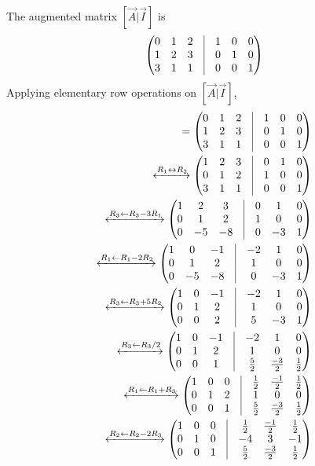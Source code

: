 \documentclass[journal,12pt,twocolumn]{IEEEtran}
\renewcommand\thesection{\arabic{section}}
\begin{document}
\begin{enumerate}[label=\thesection.\arabic*.,ref=\thesection.\theenumi]
     The augmented matrix $[\vec{A} | \vec{I}]$ is 
    \begin{align}
    \myvec{0 & 1 & 2 & \vrule & 1 & 0 & 0\\1 & 2 & 3 & \vrule & 0 & 1 & 0\\3 & 1 & 1 & \vrule & 0 & 0 & 1}
    \end{align}
    Applying elementary row operations on $[\vec{A} | \vec{I}]$, 
    \begin{align}
    [\vec{A} | \vec{I}] = \myvec{0 & 1 & 2 & \vrule & 1 & 0 & 0\\1 & 2 & 3 & \vrule & 0 & 1 & 0\\3 & 1 & 1 & \vrule & 0 & 0 & 1}
    \\
    \xleftrightarrow{R_1\leftrightarrow R_2}   
    \myvec{1 & 2 & 3 & \vrule & 0 & 1 & 0\\0 & 1 & 2 & \vrule & 1 & 0 & 0\\3 & 1 & 1 & \vrule & 0 & 0 & 1}
    \\
    \xleftrightarrow{R_3\leftarrow R_3-3R_1}   
    \myvec{1 & 2 & 3 & \vrule & 0 & 1 & 0\\0 & 1 & 2 & \vrule & 1 & 0 & 0\\0 & -5 & -8 & \vrule & 0 & -3 & 1}
    \\
    \xleftrightarrow{R_1\leftarrow R_1-2R_2}  
    \myvec{1 & 0 & -1 & \vrule & -2 & 1 & 0\\0 & 1 & 2 & \vrule & 1 & 0 & 0\\0 & -5 & -8 & \vrule & 0 & -3 & 1}
    \\
    \xleftrightarrow{R_3\leftarrow R_3+5R_2}  
    \myvec{1 & 0 & -1 & \vrule & -2 & 1 & 0\\0 & 1 & 2 & \vrule & 1 & 0 & 0\\0 & 0 & 2 & \vrule & 5 & -3 & 1}
    \\
    \xleftrightarrow{R_3\leftarrow R_3/2}
    \myvec{1 & 0 & -1 & \vrule & -2 & 1 & 0\\ 0 & 1 & 2 & \vrule & 1 & 0 & 0\\0 & 0 & 1 &\vrule &\frac{5}{2} &\frac{-3}{2} &\frac{1}{2}}
    \\
    \xleftrightarrow{R_1\leftarrow R_1+R_3}
    \myvec{1 & 0 & 0 & \vrule & \frac{1}{2} & \frac{-1}{2} & \frac{1}{2}\\ 0 & 1 & 2 & \vrule & 1 & 0 & 0\\0 & 0 & 1 &\vrule &\frac{5}{2} &\frac{-3}{2} &\frac{1}{2}}
    \\
    \xleftrightarrow{R_2\leftarrow R_2-2R_3}
    \myvec{1 & 0 & 0 & \vrule & \frac{1}{2} & \frac{-1}{2} & \frac{1}{2}\\ 0 & 1 & 0 & \vrule & -4 & 3 & -1\\0 & 0 & 1 &\vrule &\frac{5}{2} &\frac{-3}{2} &\frac{1}{2}}

\end{align}
\end{enumerate}
\end{document}
